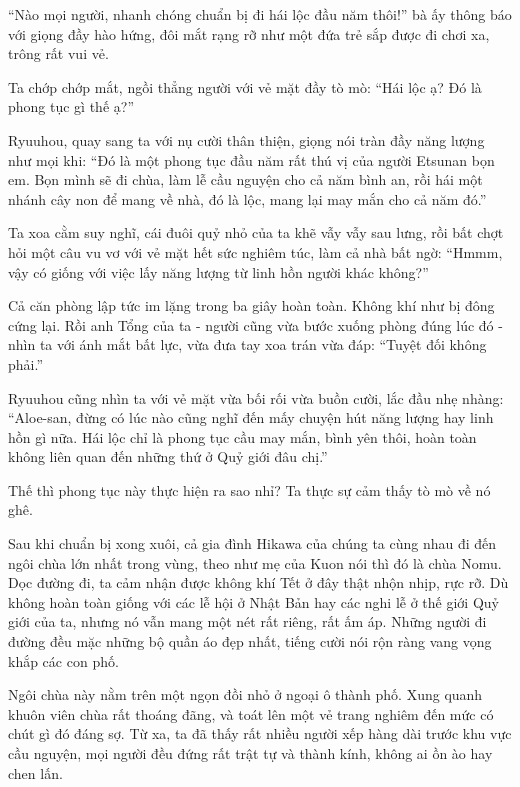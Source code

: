 \documentclass[../main.tex]{subfiles}
\begin{document}
``Nào mọi người, nhanh chóng chuẩn bị đi hái lộc đầu năm thôi!'' bà ấy thông báo với giọng đầy hào hứng, đôi mắt rạng rỡ như một đứa trẻ sắp được đi chơi xa, trông rất vui vẻ.

Ta chớp chớp mắt, ngồi thẳng người với vẻ mặt đầy tò mò: ``Hái lộc ạ? Đó là phong tục gì thế ạ?''

Ryuuhou, quay sang ta với nụ cười thân thiện, giọng nói tràn đầy năng lượng như mọi khi: ``Đó là một phong tục đầu năm rất thú vị của người Etsunan bọn em. Bọn mình sẽ đi chùa, làm lễ cầu nguyện cho cả năm bình an, rồi hái một nhánh cây non để mang về nhà, đó là lộc, mang lại may mắn cho cả năm đó.''

Ta xoa cằm suy nghĩ, cái đuôi quỷ nhỏ của ta khẽ vẫy vẫy sau lưng, rồi bất chợt hỏi một câu vu vơ với vẻ mặt hết sức nghiêm túc, làm cả nhà bất ngờ: ``Hmmm, vậy có giống với việc lấy năng lượng từ linh hồn người khác không?''

Cả căn phòng lập tức im lặng trong ba giây hoàn toàn. Không khí như bị đông cứng lại. Rồi anh Tổng của ta - người cũng vừa bước xuống phòng đúng lúc đó - nhìn ta với ánh mắt bất lực, vừa đưa tay xoa trán vừa đáp: ``Tuyệt đối không phải.''

Ryuuhou cũng nhìn ta với vẻ mặt vừa bối rối vừa buồn cười, lắc đầu nhẹ nhàng: ``Aloe-san, đừng có lúc nào cũng nghĩ đến mấy chuyện hút năng lượng hay linh hồn gì nữa. Hái lộc chỉ là phong tục cầu may mắn, bình yên thôi, hoàn toàn không liên quan đến những thứ ở Quỷ giới đâu chị.''

Thế thì phong tục này thực hiện ra sao nhỉ? Ta thực sự cảm thấy tò mò về nó ghê.

\ct

Sau khi chuẩn bị xong xuôi, cả gia đình Hikawa của chúng ta cùng nhau đi đến ngôi chùa lớn nhất trong vùng, theo như mẹ của Kuon nói thì đó là chùa Nomu. Dọc đường đi, ta cảm nhận được không khí Tết ở đây thật nhộn nhịp, rực rỡ. Dù không hoàn toàn giống với các lễ hội ở Nhật Bản hay các nghi lễ ở thế giới Quỷ giới của ta, nhưng nó vẫn mang một nét rất riêng, rất ấm áp. Những người đi đường đều mặc những bộ quần áo đẹp nhất, tiếng cười nói rộn ràng vang vọng khắp các con phố.

Ngôi chùa này nằm trên một ngọn đồi nhỏ ở ngoại ô thành phố. Xung quanh khuôn viên chùa rất thoáng đãng, và toát lên một vẻ trang nghiêm đến mức có chút gì đó đáng sợ. Từ xa, ta đã thấy rất nhiều người xếp hàng dài trước khu vực cầu nguyện, mọi người đều đứng rất trật tự và thành kính, không ai ồn ào hay chen lấn.
\end{document}

